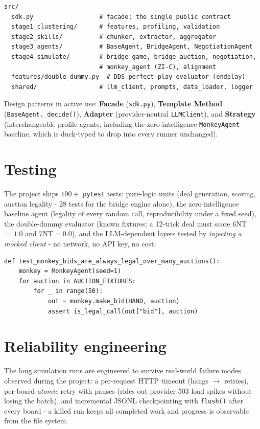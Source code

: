 \documentclass[11pt, a4paper, oneside, openany]{report}
\begin{document}
\begin{lstlisting}
src/
  sdk.py                  # facade: the single public contract
  stage1_clustering/      # features, profiling, validation
  stage2_skills/          # chunker, extractor, aggregator
  stage3_agents/          # BaseAgent, BridgeAgent, NegotiationAgent
  stage4_simulate/        # bridge_game, bridge_auction, negotiation,
                          # monkey_agent (ZI-C), alignment
  features/double_dummy.py  # DDS perfect-play evaluator (endplay)
  shared/                 # llm_client, prompts, data_loader, logger
\end{lstlisting}

Design patterns in active use: \textbf{Facade} (\texttt{sdk.py}),
\textbf{Template Method} (\texttt{BaseAgent.\_decide()}),
\textbf{Adapter} (provider-neutral \texttt{LLMClient}),
and \textbf{Strategy} (interchangeable profile agents, including the
zero-intelligence \texttt{MonkeyAgent} baseline, which is duck-typed to drop
into every runner unchanged).

\section{Testing}
The project ships $100{+}$ \texttt{pytest} tests: pure-logic units (deal
generation, scoring, auction legality - 28 tests for the bridge engine
alone), the zero-intelligence baseline agent (legality of every random call,
reproducibility under a fixed seed), the double-dummy evaluator (known
fixtures: a 12-trick deal must score $6$NT${}=1.0$ and $7$NT${}=0.0$), and
the LLM-dependent layers tested by \emph{injecting a mocked client} - no
network, no API key, no cost:

\begin{lstlisting}
def test_monkey_bids_are_always_legal_over_many_auctions():
    monkey = MonkeyAgent(seed=1)
    for auction in AUCTION_FIXTURES:
        for _ in range(50):
            out = monkey.make_bid(HAND, auction)
            assert is_legal_call(out["bid"], auction)
\end{lstlisting}

\section{Reliability engineering}
The long simulation runs are engineered to survive real-world failure modes
observed during the project: a per-request HTTP timeout (hangs
$\rightarrow$ retries), per-board \emph{atomic} retry with pauses (rides out
provider 503 load spikes without losing the batch), and incremental JSONL
checkpointing with \texttt{flush()} after every board - a killed run keeps
all completed work and progress is observable from the file system.
\end{document}
